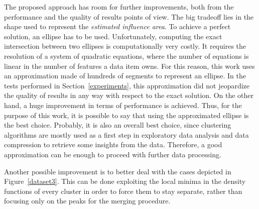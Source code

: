 The proposed approach has room for further improvements, both from
the performance and the quality of results points of view. The big tradeoff
lies in the shape used to represent the \emph{estimated influence area}. To
achieve a perfect solution, an ellipse has to be used. Unfortunately, computing
the exact intersection between two ellipses is computationally very costly.
It requires the resolution of a system of quadratic equations, where the number
of equations is linear in the number of features a data item owns.
For this reason, this work uses an approximation made of hundreds of segments
to represent an ellipse. In the tests performed in Section~\ref{experiments},
this approximation did not jeopardize the quality of results in any way with
respect to the exact solution. On the other hand, a huge improvement in terms
of performance is achieved. Thus, for the purpose of this work, it is possible
to say that using the approximated ellipse is the best choice. Probably, it is
also an overall best choice, since clustering algorithms are mostly used as
a first step in exploratory data analysis and data compression to retrieve
some insights from the data. Therefore, a good approximation can be enough
to proceed with further data processing.

Another possible improvement is to better deal with the cases depicted in
Figure~\ref{dataset3}. This can be done exploiting the local minima
in the density functions of every cluster in order to force them to stay
separate, rather than focusing only on the peaks for the merging procedure.
